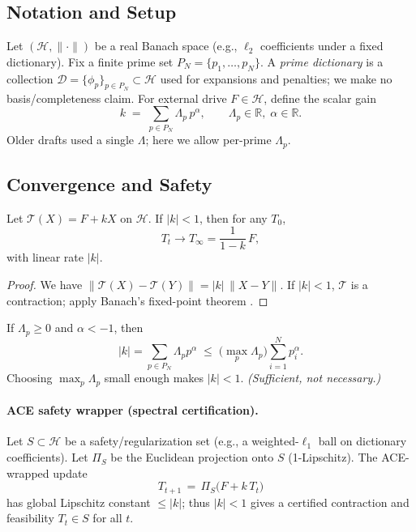 \documentclass[11pt]{article}
\theoremstyle{definition}
\theoremstyle{remark}
\newcommand{\R}{\mathbb{R}}
\newcommand{\Hhh}{\mathcal{H}}
\newcommand{\D}{\mathcal{D}}
\newcommand{\1}{\mathbf{1}}
\begin{document}
\subsection{Notation and Setup}
Let $(\Hhh,\|\cdot\|)$ be a real Banach space (e.g., $\ell_2$ coefficients under a fixed dictionary). Fix a finite prime set $P_N=\{p_1,\dots,p_N\}$. A \emph{prime dictionary} is a collection $\D=\{\phi_p\}_{p\in P_N}\subset\Hhh$ used for expansions and penalties; we make no basis/completeness claim. For external drive $F\in\Hhh$, define the scalar gain
\begin{equation}
  k\;=\;\sum_{p\in P_N}\Lambda_p\,p^{\alpha},\qquad \Lambda_p\in\R,\;\alpha\in\R.
  \label{eq:gain}
\end{equation}
Older drafts used a single $\Lambda$; here we allow per-prime $\Lambda_p$.

\subsection{Convergence and Safety}
\begin{theorem}\label{thm:contraction}
Let $\mathcal T(X)=F+kX$ on $\Hhh$. If $|k|<1$, then for any $T_0$,
\begin{equation*}
  T_t \to T_\infty = \frac{1}{1-k}\,F,
\end{equation*}
with linear rate $|k|$.
\end{theorem}
\begin{proof}
We have $\|\mathcal T(X)-\mathcal T(Y)\|=|k|\,\|X-Y\|$. If $|k|<1$, $\mathcal T$ is a contraction; apply Banach's fixed-point theorem \cite{BauschkeCombettes2017}.
\end{proof}

\begin{lemma}\label{lem:sufficient}
If $\Lambda_p\ge 0$ and $\alpha<-1$, then
\begin{equation*}
  |k|=\sum_{p\in P_N}\Lambda_p p^{\alpha}
  \;\le\; \Big(\max_{p}\Lambda_p\Big)\sum_{i=1}^{N}p_i^{\alpha}.
\end{equation*}
Choosing $\max_p\Lambda_p$ small enough makes $|k|<1$. \emph{(Sufficient, not necessary.)}
\end{lemma}

\paragraph{ACE safety wrapper (spectral certification).} Let $S\subset\Hhh$ be a safety/regularization set (e.g., a weighted-$\ell_1$ ball on dictionary coefficients). Let $\Pi_S$ be the Euclidean projection onto $S$ (1-Lipschitz). The ACE-wrapped update
\begin{equation}
  T_{t+1} \,=\, \Pi_S\!\big(F+k\,T_t\big)
  \label{eq:ace}
\end{equation}
has global Lipschitz constant $\le |k|$; thus $|k|<1$ gives a certified contraction and feasibility $T_t\in S$ for all $t$.
\end{document}
